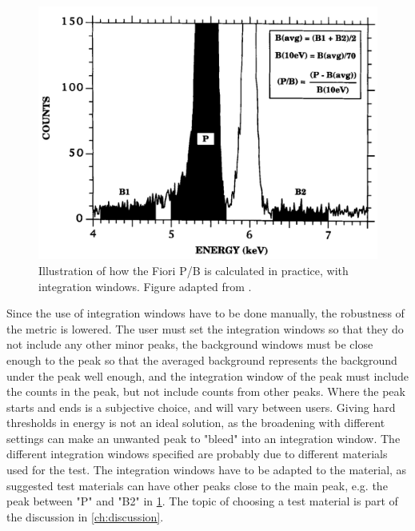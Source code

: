 \begin{figure}[htbp]
    \centering
    \includegraphics[width=0.6\linewidth]{figures/FioriPB_reality_TODO_remake.png}
    \caption{
        Illustration of how the Fiori P/B is calculated in practice, with integration windows.
        Figure adapted from \cite{zemyan_standard_performance_1994}.
    }
    \label{fig:fiori_pb_reality}
\end{figure}


Since the use of integration windows have to be done manually, the robustness of the metric is lowered.
The user must set the integration windows so that they do not include any other minor peaks, the background windows must be close enough to the peak so that the averaged background represents the background under the peak well enough, and the integration window of the peak must include the counts in the peak, but not include counts from other peaks.
Where the peak starts and ends is a subjective choice, and will vary between users.
Giving hard thresholds in energy is not an ideal solution, as the broadening with different settings can make an unwanted peak to "bleed" into an integration window.
The different integration windows specified are probably due to different materials used for the test.
The integration windows have to be adapted to the material, as suggested test materials can have other peaks close to the main peak, e.g. the peak between "P" and "B2" in \cref{fig:fiori_pb_reality}.
The topic of choosing a test material is part of the discussion in \cref{ch:discussion}.



